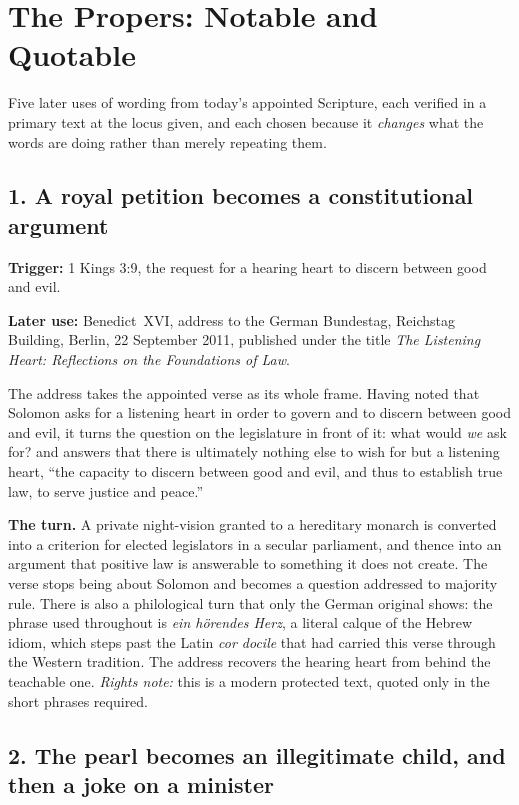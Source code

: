 \section*{The Propers: Notable and Quotable}

Five later uses of wording from today's appointed Scripture, each verified in a primary text at the locus given, and each chosen because it \emph{changes} what the words are doing rather than merely repeating them.

\subsection*{1. A royal petition becomes a constitutional argument}

\textbf{Trigger:} 1 Kings 3:9, the request for a hearing heart to discern between good and evil.\par\noindent
\textbf{Later use:} Benedict~XVI, address to the German Bundestag, Reichstag Building, Berlin, 22 September 2011, published under the title \emph{The Listening Heart: Reflections on the Foundations of Law}.

The address takes the appointed verse as its whole frame. Having noted that Solomon asks for a listening heart in order to govern and to discern between good and evil, it turns the question on the legislature in front of it: what would \emph{we} ask for? and answers that there is ultimately nothing else to wish for but a listening heart, ``the capacity to discern between good and evil, and thus to establish true law, to serve justice and peace.''

\textbf{The turn.} A private night-vision granted to a hereditary monarch is converted into a criterion for elected legislators in a secular parliament, and thence into an argument that positive law is answerable to something it does not create. The verse stops being about Solomon and becomes a question addressed to majority rule. There is also a philological turn that only the German original shows: the phrase used throughout is \emph{ein hörendes Herz}, a literal calque of the Hebrew idiom, which steps past the Latin \emph{cor docile} that had carried this verse through the Western tradition. The address recovers the hearing heart from behind the teachable one. \emph{Rights note:} this is a modern protected text, quoted only in the short phrases required.

\subsection*{2. The pearl becomes an illegitimate child, and then a joke on a minister}

